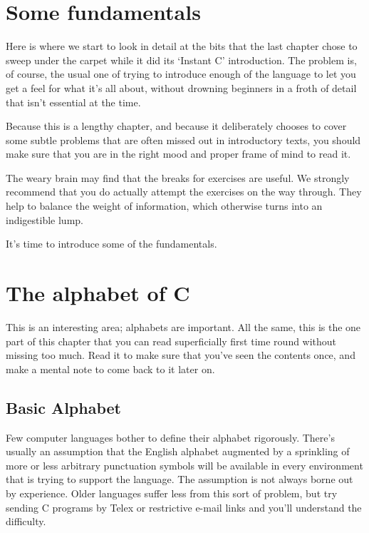         \section{Some fundamentals}
        

  

  Here is where we start to look in detail at the bits that the last
   chapter chose to sweep under the carpet while it did its
   `Instant C' introduction. The problem is, of course, the usual
   one of trying to introduce enough of the language to let you get a feel for
   what it's all about, without drowning beginners in a froth of detail that
   isn't essential at the time.


  Because this is a lengthy chapter, and because it deliberately chooses to
   cover some subtle problems that are often missed out in introductory texts,
   you should make sure that you are in the right mood and proper frame of
   mind to read it.


  The weary brain may find that the breaks for exercises are useful. We
   strongly recommend that you do actually attempt the exercises on the way
   through. They help to balance the weight of information, which otherwise
   turns into an indigestible lump.


  It's time to introduce some of the fundamentals.


 
        \section{The alphabet of C}
        

  

  This is an interesting area; alphabets are important. All the same, this
   is the one part of this chapter that you can read superficially first time
   round without missing too much. Read it to make sure that you've seen the
   contents once, and make a mental note to come back to it later on.


  \subsection{Basic Alphabet}\label{subsec:alpha}
   

   Few computer languages bother to define their alphabet rigorously.
    There's usually an assumption that the English alphabet augmented by a
    sprinkling of more or less arbitrary punctuation symbols will be available
    in every environment that is trying to support the language. The
    assumption is not always borne out by experience. Older languages suffer
    less from this sort of problem, but try sending C programs by Telex
    or restrictive e-mail links and you'll understand the difficulty.


